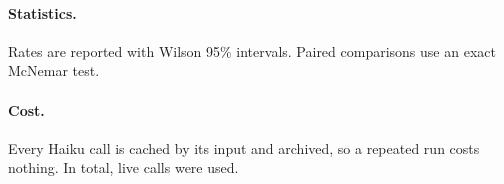 \paragraph{Statistics.} Rates are reported with Wilson 95\% intervals. Paired comparisons use an exact McNemar test.

\paragraph{Cost.} Every Haiku call is cached by its input and archived, so a repeated run costs nothing. In total, \haikuCalls{} live calls were used.
